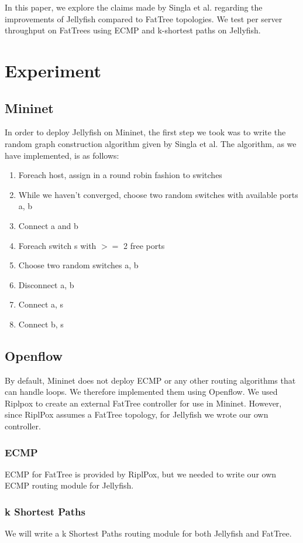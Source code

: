 \documentclass{acm_proc_article-sp}
\begin{document}
In this paper, we explore the claims made by Singla et al. regarding the improvements
of Jellyfish compared to FatTree topologies. We test per server throughput on 
FatTrees using ECMP and k-shortest paths on Jellyfish. 

\section{Experiment}
\subsection{Mininet}
In order to deploy Jellyfish on Mininet, the first step we took was to write the
random graph construction algorithm given by Singla et al. The algorithm, as
we have implemented, is as follows:
\begin{enumerate}
\item Foreach host, assign in a round robin fashion to switches
\item While we haven't converged, choose two random switches with available ports a, b
  \item Connect a and b
\item Foreach switch s with $>=$ 2 free ports
  \item Choose two random switches a, b
  \item Disconnect a, b
  \item Connect a, s
  \item Connect b, s
\end{enumerate}

\subsection{Openflow}
By default, Mininet does not deploy ECMP or any other routing algorithms that can handle loops. 
We therefore implemented them using Openflow. We used Riplpox to create an external FatTree 
controller for use in Mininet. However, since RiplPox assumes a FatTree topology, for Jellyfish 
we wrote our own controller. 
\subsubsection{ECMP}
ECMP for FatTree is provided by RiplPox, but we needed to write our own ECMP routing module for Jellyfish.
\subsubsection{k Shortest Paths}
We will write a k Shortest Paths routing module for both Jellyfish and FatTree.
\end{document}
